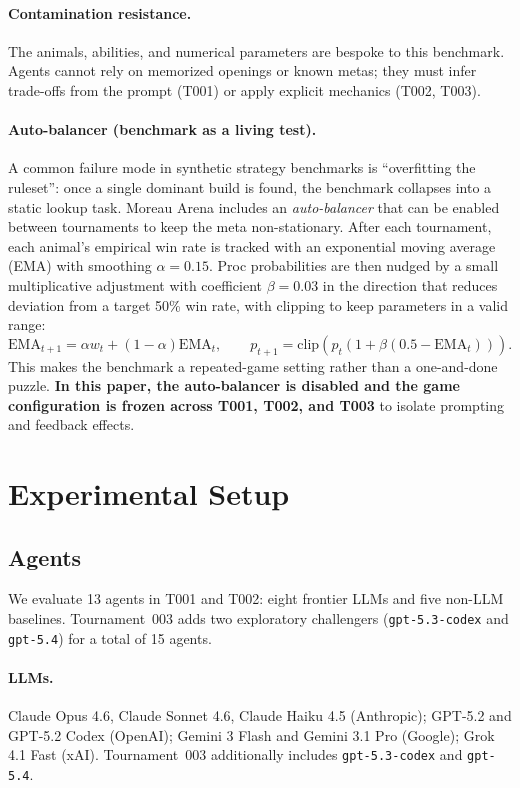 \documentclass[11pt]{article}
\newcommand{\tOne}{T001}
\newcommand{\tTwo}{T002}
\newcommand{\tThree}{T003}
\begin{document}
\paragraph{Contamination resistance.}
The animals, abilities, and numerical parameters are bespoke to this benchmark.
Agents cannot rely on memorized openings or known metas; they must infer trade-offs from the prompt (\tOne) or apply explicit mechanics (\tTwo, \tThree).

\paragraph{Auto-balancer (benchmark as a living test).}
A common failure mode in synthetic strategy benchmarks is ``overfitting the ruleset'': once a single dominant build is found, the benchmark collapses into a static lookup task.
Moreau Arena includes an \emph{auto-balancer} that can be enabled between tournaments to keep the meta non-stationary.
After each tournament, each animal's empirical win rate is tracked with an exponential moving average (EMA) with smoothing $\alpha=0.15$.
Proc probabilities are then nudged by a small multiplicative adjustment with coefficient $\beta=0.03$ in the direction that reduces deviation from a target 50\% win rate, with clipping to keep parameters in a valid range:
\[
\mathrm{EMA}_{t+1} = \alpha w_t + (1-\alpha)\mathrm{EMA}_t,\qquad
p_{t+1} = \mathrm{clip}\!\left(p_t\left(1+\beta(0.5-\mathrm{EMA}_t)\right)\right).
\]
This makes the benchmark a repeated-game setting rather than a one-and-done puzzle.
\textbf{In this paper, the auto-balancer is disabled and the game configuration is frozen across \tOne, \tTwo, and \tThree} to isolate prompting and feedback effects.

\section{Experimental Setup}
\label{sec:setup}

\subsection{Agents}

We evaluate 13 agents in \tOne{} and \tTwo: eight frontier LLMs and five non-LLM baselines.
Tournament~003 adds two exploratory challengers (\texttt{gpt-5.3-codex} and \texttt{gpt-5.4}) for a total of 15 agents.

\paragraph{LLMs.}
Claude Opus 4.6, Claude Sonnet 4.6, Claude Haiku 4.5 (Anthropic);
GPT-5.2 and GPT-5.2 Codex (OpenAI);
Gemini 3 Flash and Gemini 3.1 Pro (Google);
Grok 4.1 Fast (xAI).
Tournament~003 additionally includes \texttt{gpt-5.3-codex} and \texttt{gpt-5.4}.
\end{document}
